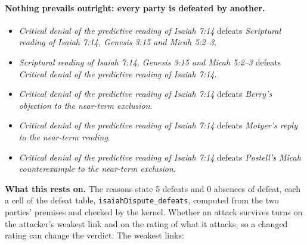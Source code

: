 \documentclass[11pt]{article}
\begin{document}
\paragraph{Nothing prevails outright: every party is defeated by another.}
\begin{itemize}
\item \emph{Critical denial of the predictive reading of Isaiah 7:14} defeats \emph{Scriptural reading of Isaiah 7:14, Genesis 3:15 and Micah 5:2–3}.
\item \emph{Scriptural reading of Isaiah 7:14, Genesis 3:15 and Micah 5:2–3} defeats \emph{Critical denial of the predictive reading of Isaiah 7:14}.
\item \emph{Critical denial of the predictive reading of Isaiah 7:14} defeats \emph{Berry’s objection to the near-term exclusion}.
\item \emph{Critical denial of the predictive reading of Isaiah 7:14} defeats \emph{Motyer’s reply to the near-term reading}.
\item \emph{Critical denial of the predictive reading of Isaiah 7:14} defeats \emph{Postell’s Micah counterexample to the near-term exclusion}.
\end{itemize}
\par\noindent\textbf{What this rests on.} The reasons state 5 defeats and 0 absences of defeat, each a cell of the defeat table, \texttt{isaiah\allowbreak{}Dispute\_\allowbreak{}defeats}, computed from the two parties' premises and checked by the kernel. Whether an attack survives turns on the attacker's weakest link and on the rating of what it attacks, so a changed rating can change the verdict. The weakest links:
\end{document}
